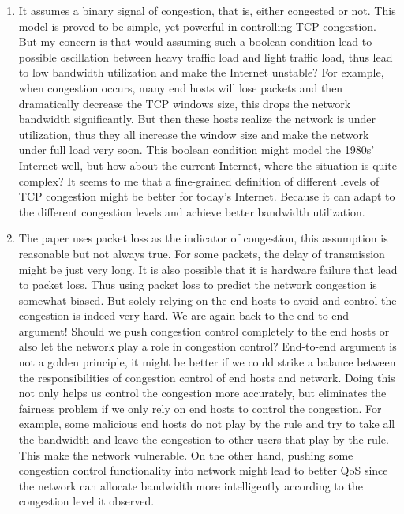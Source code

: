 \documentclass[11pt]{article}
\begin{document}
\begin{enumerate}
\item It assumes a binary signal of congestion, that is, either
  congested or not. This model is proved to be simple, yet powerful in
  controlling TCP congestion. But my concern is that would assuming
  such a boolean condition lead to possible oscillation between
  heavy traffic load and light traffic load, thus lead to low
  bandwidth utilization and make the Internet unstable? For example,
  when congestion occurs, many end hosts will lose packets and then
  dramatically decrease the TCP windows size, this drops the network
  bandwidth significantly. But then these hosts realize the network is
  under utilization, thus they all increase the window size and make
  the network under full load very soon. This boolean
  condition might model the 1980s' Internet well, but how about the
  current Internet, where the situation is quite complex? It seems to
  me that a fine-grained definition of different levels of TCP
  congestion might be better for today's Internet. Because it can
  adapt to the different congestion levels and achieve better
  bandwidth utilization. 
\item The paper uses packet loss as the indicator of congestion, this
  assumption is reasonable but not always true. For some packets, the
  delay of transmission might be just very long. It is also possible
  that it is hardware failure that lead to packet loss. Thus using
  packet loss to predict the network congestion is somewhat
  biased. But solely relying on the end hosts to avoid and control the
  congestion is indeed very hard. We are again back to the end-to-end
  argument! Should we push congestion control completely to the end
  hosts or also let the network play a role in congestion control?
  End-to-end argument is not a golden principle, it might be better if
  we could strike a balance between the responsibilities of congestion
  control of end hosts and network. Doing this not only helps us
  control the congestion more accurately, but eliminates the fairness
  problem if we only rely on end hosts to control the congestion. For
  example, some malicious end hosts do not play by the rule and try to
  take all the bandwidth and leave the congestion to other users that
  play by the rule. This make the network vulnerable. On the other
  hand, pushing some congestion control functionality into network
  might lead to better QoS since the network can allocate bandwidth 
  more intelligently according to the congestion level it observed. 
\end{enumerate}
\end{document}
